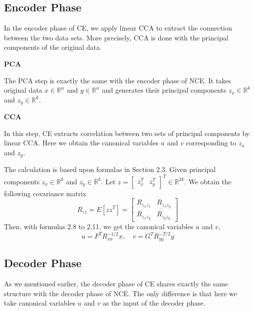 \documentclass[12pt]{report} %
\begin{document}
\subsection{Encoder Phase}
In the encoder phase of CE, we apply linear CCA to extract the connection between the two data sets. More precisely, CCA is done with the principal components of the original data.

\textbf{PCA}

The PCA step is exactly the same with the encoder phase of NCE. It takes original data $x\in \mathbb{R}^{n}$ and $y\in \mathbb{R}^{n}$ and generates their principal components $z_x\in \mathbb{R}^{k}$ and $z_y\in \mathbb{R}^{k}$.

\textbf{CCA}

In this step, CE extracts correlation between two sets of principal components by linear CCA. Here we obtain the canonical variables $u$ and $v$ corresponding to $z_x$ and $z_y$. 

The calculation is based upon formulas in Section 2.3. Given principal components $z_x\in \mathbb{R}^{k}$ and $z_y\in \mathbb{R}^{k}$. Let $z= \begin{bmatrix}z_x^T & z_y^T\end{bmatrix}^T \in \mathbb{R}^{2k}$. We obtain the following covariance matrix
\begin{equation}
R_{zz}=E[zz^T]=\begin{bmatrix}
R_{z_{x}z_{x}} & R_{z_{x}z_{y}} \\
R_{z_{x}z_{y}} & R_{z_{y}z_{y}}
\end{bmatrix}
\end{equation}
Then, with formulas 2.8 to 2.11, we get the canonical variables $u$ and $v$,
\begin{equation}
u=F^TR_{xx}^{-1/2}x,\quad v=G^TR_{yy}^{-T/2}y
\end{equation}

\subsection{Decoder Phase}
As we mentioned earlier, the decoder phase of CE shares exactly the same structure with the decoder phase of NCE. The only difference is that here we take canonical variables $u$ and $v$ as the input of the decoder phase. 
\end{document}
